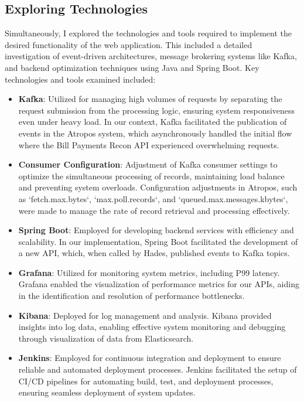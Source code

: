 \documentclass[12pt,a4paper]{report}
\begin{document}
\subsection{Exploring Technologies}

Simultaneously, I explored the technologies and tools required to implement the desired functionality of the web application. This included a detailed investigation of event-driven architectures, message brokering systems like Kafka, and backend optimization techniques using Java and Spring Boot. Key technologies and tools examined included:

\begin{itemize}
    \item \textbf{Kafka}: Utilized for managing high volumes of requests by separating the request submission from the processing logic, ensuring system responsiveness even under heavy load. In our context, Kafka facilitated the publication of events in the Atropos system, which asynchronously handled the initial flow where the Bill Payments Recon API experienced overwhelming requests.
    
    \item \textbf{Consumer Configuration}: Adjustment of Kafka consumer settings to optimize the simultaneous processing of records, maintaining load balance and preventing system overloads. Configuration adjustments in Atropos, such as `fetch.max.bytes`, `max.poll.records`, and `queued.max.messages.kbytes`, were made to manage the rate of record retrieval and processing effectively.
    
    \item \textbf{Spring Boot}: Employed for developing backend services with efficiency and scalability. In our implementation, Spring Boot facilitated the development of a new API, which, when called by Hades, published events to Kafka topics.
    
    \item \textbf{Grafana}: Utilized for monitoring system metrics, including P99 latency. Grafana enabled the visualization of performance metrics for our APIs, aiding in the identification and resolution of performance bottlenecks.
    
    \item \textbf{Kibana}: Deployed for log management and analysis. Kibana provided insights into log data, enabling effective system monitoring and debugging through visualization of data from Elasticsearch.
    
    \item \textbf{Jenkins}: Employed for continuous integration and deployment to ensure reliable and automated deployment processes. Jenkins facilitated the setup of CI/CD pipelines for automating build, test, and deployment processes, ensuring seamless deployment of system updates.
\end{itemize}
\end{document}
